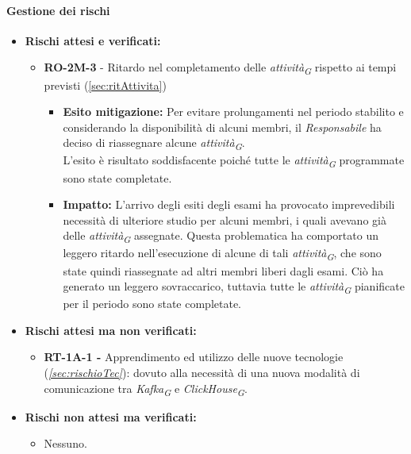 \paragraph{Gestione dei rischi} 

\begin{itemize}
    \item \textbf{Rischi attesi e verificati:}
\begin{itemize}
    \item \textbf{RO-2M-3} - Ritardo nel completamento delle \textit{attività}\textsubscript{\textit{G}} rispetto ai tempi previsti (\ref{sec:ritAttivita})
    \begin{itemize}
        \item \textbf{Esito mitigazione:} 
        Per evitare prolungamenti nel periodo stabilito e considerando la disponibilità di alcuni membri, il \textit{Responsabile} ha deciso di riassegnare alcune \textit{attività}\textsubscript{\textit{G}}. \\
        L'esito è risultato soddisfacente poiché tutte le \textit{attività}\textsubscript{\textit{G}} programmate sono state completate.
        \item \textbf{Impatto:}
        L'arrivo degli esiti degli esami ha provocato imprevedibili necessità di ulteriore studio per alcuni membri, i quali avevano già delle \textit{attività}\textsubscript{\textit{G}} assegnate. Questa problematica ha comportato un leggero ritardo nell'esecuzione di alcune di tali \textit{attività}\textsubscript{\textit{G}}, che sono state quindi riassegnate ad altri membri liberi dagli esami. Ciò ha generato un leggero sovraccarico, tuttavia tutte le \textit{attività}\textsubscript{\textit{G}} pianificate per il periodo sono state completate.
    \end{itemize}
\end{itemize}
\item \textbf{Rischi attesi ma non verificati:}
 \begin{itemize}
    \item  \textbf{RT-1A-1 -} Apprendimento ed utilizzo delle nuove tecnologie (\textit{\ref{sec:rischioTec}}): dovuto alla necessità di una nuova modalità di comunicazione tra \textit{Kafka}\textsubscript{\textit{G}} e \textit{ClickHouse}\textsubscript{\textit{G}}.
\end{itemize}
\item \textbf{Rischi non attesi ma verificati:}
\begin{itemize}
    \item Nessuno.
\end{itemize}
\end{itemize}

